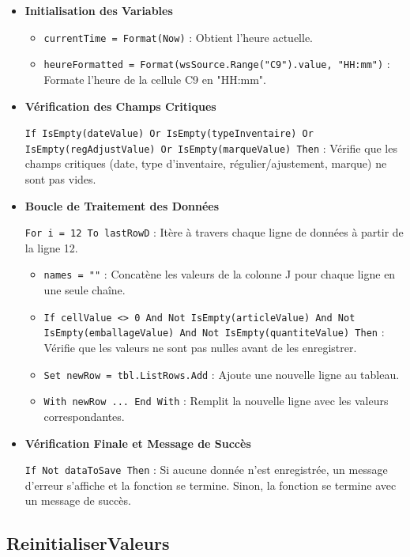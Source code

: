 \documentclass[a4paper, oneside, 12pt, final]{extreport}
\begin{document}
\begin{itemize}
\item\textbf{Initialisation des Variables}

\begin{itemize}
    \item \texttt{currentTime = Format(Now)} : Obtient l'heure actuelle.
    \item \texttt{heureFormatted = Format(wsSource.Range("C9").value, "HH:mm")} : Formate l'heure de la cellule C9 en "HH:mm".
\end{itemize}

\item\textbf{Vérification des Champs Critiques}

\texttt{If IsEmpty(dateValue) Or IsEmpty(typeInventaire) Or IsEmpty(regAdjustValue) Or IsEmpty(marqueValue) Then} : Vérifie que les champs critiques (date, type d'inventaire, régulier/ajustement, marque) ne sont pas vides.

\item\textbf{Boucle de Traitement des Données}

\texttt{For i = 12 To lastRowD} : Itère à travers chaque ligne de données à partir de la ligne 12.

\begin{itemize}
    \item \texttt{names = ""} : Concatène les valeurs de la colonne J pour chaque ligne en une seule chaîne.
    \item \texttt{If cellValue <> 0 And Not IsEmpty(articleValue) And Not IsEmpty(emballageValue) And Not IsEmpty(quantiteValue) Then} : Vérifie que les valeurs ne sont pas nulles avant de les enregistrer.
    \item \texttt{Set newRow = tbl.ListRows.Add} : Ajoute une nouvelle ligne au tableau.
    \item \texttt{With newRow ... End With} : Remplit la nouvelle ligne avec les valeurs correspondantes.
\end{itemize}

\item\textbf{Vérification Finale et Message de Succès}

\texttt{If Not dataToSave Then} : Si aucune donnée n'est enregistrée, un message d'erreur s'affiche et la fonction se termine. Sinon, la fonction se termine avec un message de succès.
\end{itemize}

\subsection{ReinitialiserValeurs}
\end{document}
